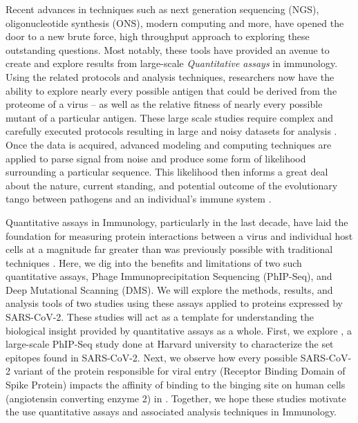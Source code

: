 \documentclass{article}
\begin{document}
Recent advances in techniques such as next generation sequencing (NGS), oligonucleotide synthesis (ONS), modern computing and more, have opened the door to a new brute force, high throughput approach to exploring these outstanding questions.
Most notably, these tools have provided an avenue to create and explore results from large-scale \textit{Quantitative assays} in immunology.
Using the related protocols and analysis techniques, researchers now have the ability to explore nearly every possible antigen that could be derived from the proteome of a virus -- as well as the relative fitness of nearly every possible mutant of a particular antigen.
These large scale studies require complex and carefully executed protocols resulting in large and noisy datasets for analysis \citep{Mohan2018, Bloom2014, Shrock2020}.
Once the data is acquired, advanced modeling and computing techniques are applied to parse signal from noise and produce some form of likelihood surrounding a particular sequence.
This likelihood then informs a great deal about the nature, current standing, and potential outcome of the evolutionary tango between pathogens and an individual's immune system \citep{Garrett2020}.


Quantitative assays in Immunology, particularly in the last decade, have laid the foundation for measuring protein interactions between a virus and individual host cells at a magnitude far greater than was previously possible with traditional techniques \citep{Fowler2014, Bloom2014}.
Here, we dig into the benefits and limitations of two such quantitative assays, Phage Immunoprecipitation Sequencing (PhIP-Seq), and Deep Mutational Scanning (DMS).
We will explore the methods, results, and analysis tools of two studies using these assays applied to proteins expressed by SARS-CoV-2.
These studies will act as a template for understanding the biological insight provided by quantitative assays as a whole.
First, we explore \citet{Shrock2020}, a large-scale PhIP-Seq study done at Harvard university to characterize the set epitopes found in SARS-CoV-2.
Next, we observe how every possible SARS-CoV-2 variant of the protein responsible for viral entry (Receptor Binding Domain of Spike Protein) impacts the affinity of binding to the binging site on human cells (angiotensin converting enzyme 2) in \cite{Starr2020}.
Together, we hope these studies motivate the use quantitative assays and associated analysis techniques in Immunology.
\end{document}
